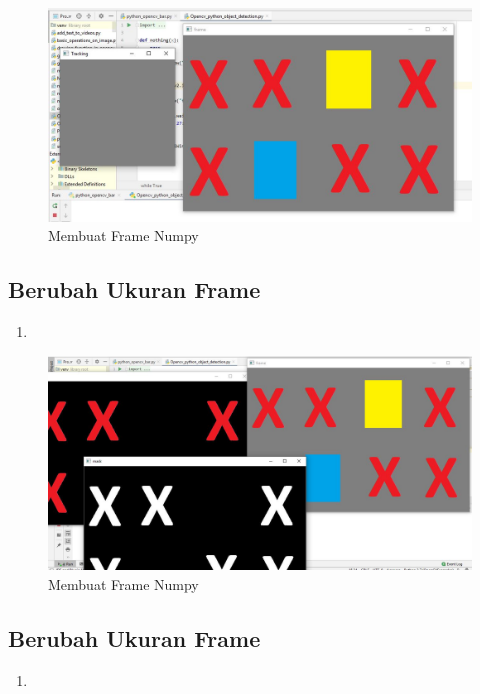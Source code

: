 \begin{figure}[ht]
\centering
\includegraphics[scale=0.5]{figures/2,34.jpg}
\caption{Membuat Frame Numpy}
\label{contoh}
\end{figure}



\newpage
\subsection{Berubah Ukuran Frame}

\begin{enumerate}
	\item
\end{enumerate}

\begin{figure}[ht]
\centering
\includegraphics[scale=0.5]{figures/2,35.jpg}
\caption{Membuat Frame Numpy}
\label{contoh}
\end{figure}



\newpage
\subsection{Berubah Ukuran Frame}

\begin{enumerate}
	\item
\end{enumerate}

